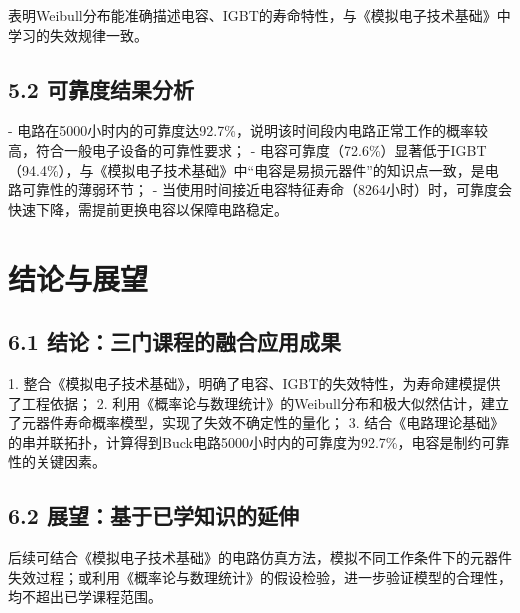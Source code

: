 \documentclass{article}
\begin{document}
表明Weibull分布能准确描述电容、IGBT的寿命特性，与《模拟电子技术基础》中学习的失效规律一致。

\subsection*{5.2 可靠度结果分析}
- 电路在5000小时内的可靠度达92.7\%，说明该时间段内电路正常工作的概率较高，符合一般电子设备的可靠性要求；
- 电容可靠度（72.6\%）显著低于IGBT（94.4\%），与《模拟电子技术基础》中“电容是易损元器件”的知识点一致，是电路可靠性的薄弱环节；
- 当使用时间接近电容特征寿命（8264小时）时，可靠度会快速下降，需提前更换电容以保障电路稳定。

\section*{结论与展望}
\subsection*{6.1 结论：三门课程的融合应用成果}
1. 整合《模拟电子技术基础》，明确了电容、IGBT的失效特性，为寿命建模提供了工程依据；
2. 利用《概率论与数理统计》的Weibull分布和极大似然估计，建立了元器件寿命概率模型，实现了失效不确定性的量化；
3. 结合《电路理论基础》的串并联拓扑，计算得到Buck电路5000小时内的可靠度为92.7\%，电容是制约可靠性的关键因素。

\subsection*{6.2 展望：基于已学知识的延伸}
后续可结合《模拟电子技术基础》的电路仿真方法，模拟不同工作条件下的元器件失效过程；或利用《概率论与数理统计》的假设检验，进一步验证模型的合理性，均不超出已学课程范围。


\newpage

\printbibliography
\end{document}
